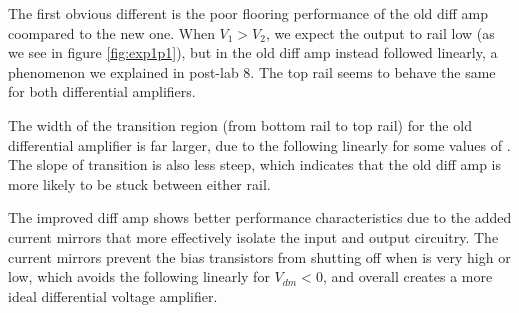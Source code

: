 The first obvious different is the poor flooring performance of the old diff amp coompared to the new one. When $V_1 > V_2$, we expect the output to rail low (as we see in figure \ref{fig:exp1p1}), but in the old diff amp \Vout instead followed \Vone linearly, a phenomenon we explained in post-lab 8. The top rail seems to behave the same for both differential amplifiers.

The width of the transition region (from bottom rail to top rail) for the old differential amplifier is far larger, due to the \Vout following \Vone linearly for some values of \Vone. The slope of transition is also less steep, which indicates that the old diff amp is more likely to be stuck between either rail.

The improved diff amp shows better performance characteristics due to the added current mirrors that more effectively isolate the input and output circuitry. The current mirrors prevent the bias transistors from shutting off when \Vout is very high or low, which avoids the \Vout following \Vin linearly for $V_{dm} < 0$, and overall creates a more ideal differential voltage amplifier.